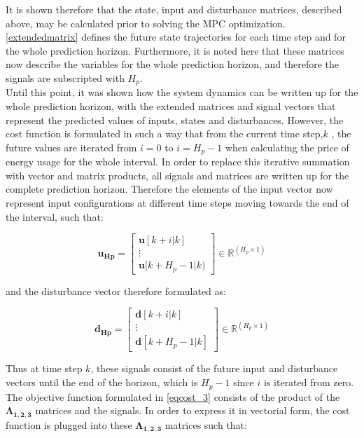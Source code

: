 It is shown therefore that the state, input and disturbance matrices, described above, may be calculated prior to solving the MPC optimization. \eqref{extendedmatrix} defines the future state trajectories for each time step and for the whole prediction horizon. Furthermore, it is noted here that these matrices now describe the variables for the whole prediction horizon, and therefore the signals are subscripted with $H_p$. 
\\
\newline
Until this point, it was shown how the system dynamics can be written up for the whole prediction horizon, with the extended matrices and signal vectors that represent the predicted values of inputs, states and disturbances. However, the cost function is formulated in such a way that from the current time step,$k$ , the future values are iterated from $i = 0$ to $i = H_p - 1$ when calculating the price of energy usage for the whole interval. In order to replace this iterative summation with vector and matrix products, all signals and matrices are written up for the complete prediction horizon. Therefore the elements of the input vector now represent input configurations at different time steps moving towards the end of the interval, such that:

\begin{equation}
\bm{u_{Hp}} =  
 \begin{bmatrix}
  \bm{u}[k+i|k]\\
  \vdots  \\
  \bm{u}[k+H_p-1|k)   
 \end{bmatrix}
 \in \pmb{\mathbb{R}}^{(H_p \times 1)}
\end{equation}

and the disturbance vector therefore formulated as:

\begin{equation}
\bm{d_{Hp}} =  
 \begin{bmatrix}
  \bm{d}[k+i|k]\\
  \vdots  \\
  \bm{d}[k+H_p-1|k]   
 \end{bmatrix}
 \in \pmb{\mathbb{R}}^{(H_p \times 1)}
\end{equation}

Thus at time step $k$, these signals consist of the future input and disturbance vectors until the end of the horizon, which is $H_p - 1$ since $i$ is iterated from zero. 
\\
\newline
The objective function formulated in \eqref{eqcost_3} consists of the product of the $\bm{\Lambda_{1,2,3}}$ matrices and the signals. In order to express it in vectorial form, the cost function is plugged into these $\bm{\Lambda_{1,2,3}}$ matrices such that:

